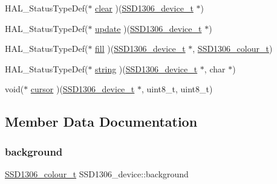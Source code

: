 \begin{DoxyCompactItemize}
H\+A\+L\+\_\+\+Status\+Type\+Def($\ast$ \hyperlink{structSSD1306__device_aa52b8e4126ce8b86afca1428e410340a}{clear} )(\hyperlink{datatypes_8h_afa3700e77990b75b3fcc954070aa90fe}{S\+S\+D1306\+\_\+device\+\_\+t} $\ast$)
\item 
H\+A\+L\+\_\+\+Status\+Type\+Def($\ast$ \hyperlink{structSSD1306__device_a99b7467f867b5422a1c732c4aa66d755}{update} )(\hyperlink{datatypes_8h_afa3700e77990b75b3fcc954070aa90fe}{S\+S\+D1306\+\_\+device\+\_\+t} $\ast$)
\item 
H\+A\+L\+\_\+\+Status\+Type\+Def($\ast$ \hyperlink{structSSD1306__device_aab0835f335c720de7250dcf5d9febdbf}{fill} )(\hyperlink{datatypes_8h_afa3700e77990b75b3fcc954070aa90fe}{S\+S\+D1306\+\_\+device\+\_\+t} $\ast$, \hyperlink{ssd1306_8h_a9fe094fa88309e2ded9db03d4c2771c6}{S\+S\+D1306\+\_\+colour\+\_\+t})
\item 
H\+A\+L\+\_\+\+Status\+Type\+Def($\ast$ \hyperlink{structSSD1306__device_a5300109afe5d1ee4ab135d660321aff4}{string} )(\hyperlink{datatypes_8h_afa3700e77990b75b3fcc954070aa90fe}{S\+S\+D1306\+\_\+device\+\_\+t} $\ast$, char $\ast$)
\item 
void($\ast$ \hyperlink{structSSD1306__device_a66f7cc22a12c45ede50843a63c0754c6}{cursor} )(\hyperlink{datatypes_8h_afa3700e77990b75b3fcc954070aa90fe}{S\+S\+D1306\+\_\+device\+\_\+t} $\ast$, uint8\+\_\+t, uint8\+\_\+t)
\end{DoxyCompactItemize}


\subsection{Member Data Documentation}
\mbox{\label{structSSD1306__device_ad0ea6059e91b7235d2de7c997f7d40e0}} 
\subsubsection{\texorpdfstring{background}{background}}
{\footnotesize\ttfamily \hyperlink{ssd1306_8h_a9fe094fa88309e2ded9db03d4c2771c6}{S\+S\+D1306\+\_\+colour\+\_\+t} S\+S\+D1306\+\_\+device\+::background}

\mbox{\label{structSSD1306__device_a304b1ccffa54fe02798eac9e4d113186}} 
